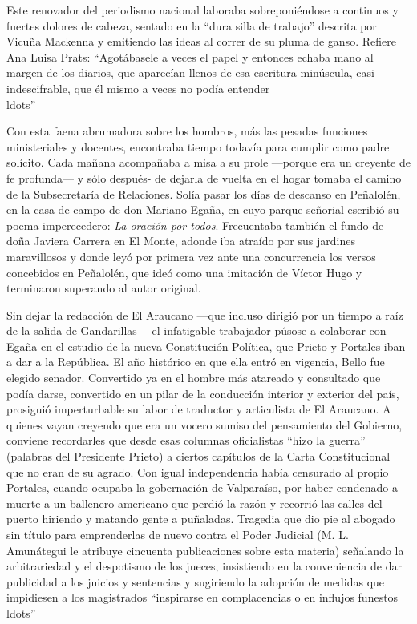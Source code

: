 \documentclass[10pt,twoside,openright]{memoir}
\begin{document}
Este renovador del periodismo nacional laboraba sobreponiéndose a
continuos y fuertes dolores de cabeza, sentado en la ``dura silla de
trabajo'' descrita por Vicuña Mackenna y emitiendo las ideas al correr de
su pluma de ganso. Refiere Ana Luisa Prats: ``Agotábasele a veces el
papel y entonces echaba mano al margen de los diarios, que aparecían
llenos de esa escritura minúscula, casi indescifrable, que él mismo a
veces no podía entender\\ldots''

Con esta faena abrumadora sobre los hombros, más las pesadas funciones
ministeriales y docentes, encontraba tiempo todavía para cumplir como
padre solícito. Cada mañana acompañaba a misa a su prole ---porque era
un creyente de fe profunda--- y sólo después- de dejarla de vuelta en el
hogar tomaba el camino de la Subsecretaría de Relaciones. Solía pasar
los días de descanso en Peñalolén, en la casa de campo de don Mariano
Egaña, en cuyo parque señorial escribió su poema imperecedero: \emph{La
oración por todos}. Frecuentaba también el fundo de doña Javiera Carrera
en El Monte, adonde iba atraído por sus jardines maravillosos y donde
leyó por primera vez ante una concurrencia los versos concebidos en
Peñalolén, que ideó como una imitación de Víctor Hugo y terminaron
superando al autor original.

Sin dejar la redacción de El Araucano ---que incluso dirigió por un
tiempo a raíz de la salida de Gandarillas--- el infatigable trabajador
púsose a colaborar con Egaña en el estudio de la nueva Constitución
Política, que Prieto y Portales iban a dar a la República. El año
histórico en que ella entró en vigencia, Bello fue elegido senador.
Convertido ya en el hombre más atareado y consultado que podía darse,
convertido en un pilar de la conducción interior y exterior del país,
prosiguió imperturbable su labor de traductor y articulista de El
Araucano. A quienes vayan creyendo que era un vocero sumiso del
pensamiento del Gobierno, conviene recordarles que desde esas columnas
oficialistas ``hizo la guerra'' (palabras del Presidente Prieto) a ciertos
capítulos de la Carta Constitucional que no eran de su agrado. Con igual
independencia había censurado al propio Portales, cuando ocupaba la
gobernación de Valparaíso, por haber condenado a muerte a un ballenero
americano que perdió la razón y recorrió las calles del puerto hiriendo
y matando gente a puñaladas. Tragedia que dio pie al abogado sin título
para emprenderlas de nuevo contra el Poder Judicial (M. L. Amunátegui le
atribuye cincuenta publicaciones sobre esta materia) señalando la
arbitrariedad y el despotismo de los jueces, insistiendo en la
conveniencia de dar publicidad a los juicios y sentencias y sugiriendo
la adopción de medidas que impidiesen a los magistrados ``inspirarse en
complacencias o en influjos funestos\\ldots''
\end{document}
